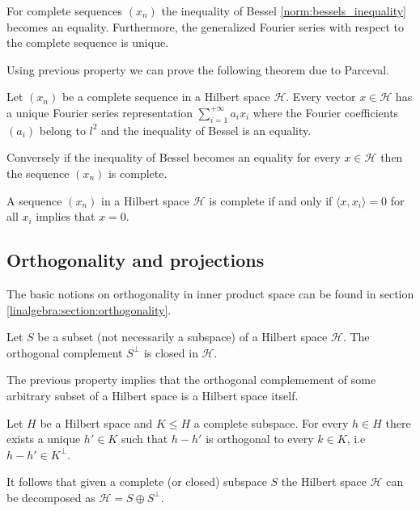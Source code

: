 	\begin{property}
		For complete sequences $(x_n)$ the inequality of Bessel \ref{norm:bessels_inequality} becomes an equality. Furthermore, the generalized Fourier series with respect to the complete sequence is unique.
	\end{property}
	
	Using previous property we can prove the following theorem due to Parceval.
	\begin{theorem}[Parceval]
		Let $(x_n)$ be a complete sequence in a Hilbert space $\mathcal{H}$. Every vector $x\in\mathcal{H}$ has a unique Fourier series representation $\sum_{i=1}^{+\infty}a_ix_i$ where the Fourier coefficients $(a_i)$ belong to $l^2$ and the inequality of Bessel is an equality.
		
		Conversely if the inequality of Bessel becomes an equality for every $x\in\mathcal{H}$ then the sequence $(x_n)$ is complete.
	\end{theorem}
	
	\begin{property}
		A sequence $(x_n)$ in a Hilbert space $\mathcal{H}$ is complete if and only if $\langle x, x_i\rangle = 0$ for all $x_i$ implies that $x=0$.
	\end{property}

\subsection{Orthogonality and projections}

	The basic notions on orthogonality in inner product space can be found in section \ref{linalgebra:section:orthogonality}.

	\begin{property}
		Let $S$ be a subset (not necessarily a subspace) of a Hilbert space $\mathcal{H}$. The orthogonal complement $S^\perp$ is closed in $\mathcal{H}$.
	\end{property}
	\begin{result}
		The previous property implies that the orthogonal complemement of some arbitrary subset of a Hilbert space is a Hilbert space itself.
	\end{result}
	
	\begin{theorem}
		\label{linalgebra:theorem:projection_theorem}
		Let $H$ be a Hilbert space and $K\leq H$ a complete subspace. For every $h\in H$ there exists a unique $h'\in K$ such that $h-h'$ is orthogonal to every $k\in K$, i.e $h-h'\in K^\perp$.
	\end{theorem}
	\begin{result}
		It follows that given a complete (or closed) subspace $S$ the Hilbert space $\mathcal{H}$ can be decomposed as $\mathcal{H} = S\oplus S^\perp$.
	\end{result}

